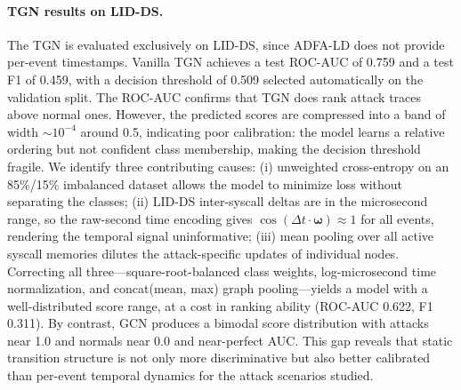 \documentclass{article}
\begin{document}
\paragraph{TGN results on LID-DS.}
The TGN is evaluated exclusively on LID-DS, since ADFA-LD does not provide per-event timestamps. Vanilla TGN achieves a test ROC-AUC of 0.759 and a test F1 of 0.459, with a decision threshold of 0.509 selected automatically on the validation split. The ROC-AUC confirms that TGN does rank attack traces above normal ones. However, the predicted scores are compressed into a band of width ${\sim}10^{-4}$ around 0.5, indicating poor calibration: the model learns a relative ordering but not confident class membership, making the decision threshold fragile. We identify three contributing causes: (i) unweighted cross-entropy on an 85\%/15\% imbalanced dataset allows the model to minimize loss without separating the classes; (ii) LID-DS inter-syscall deltas are in the microsecond range, so the raw-second time encoding gives $\cos(\Delta t \cdot \boldsymbol{\omega}) \approx 1$ for all events, rendering the temporal signal uninformative; (iii) mean pooling over all active syscall memories dilutes the attack-specific updates of individual nodes. Correcting all three---square-root-balanced class weights, log-microsecond time normalization, and concat(mean, max) graph pooling---yields a model with a well-distributed score range, at a cost in ranking ability (ROC-AUC 0.622, F1 0.311). By contrast, GCN produces a bimodal score distribution with attacks near 1.0 and normals near 0.0 and near-perfect AUC. This gap reveals that static transition structure is not only more discriminative but also better calibrated than per-event temporal dynamics for the attack scenarios studied.
\end{document}
